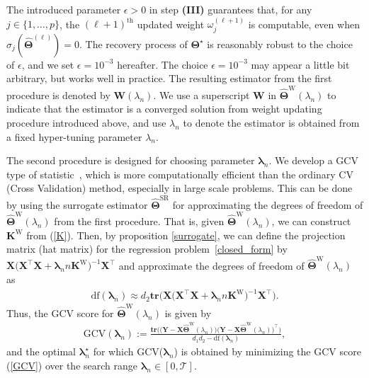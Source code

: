 \documentclass[alpha-refs]{wiley-article}
\begin{document}
The introduced parameter $\epsilon>0$ in step {\bf(III)} guarantees that, for any $j\in\{1,\dots,p\}$,  
the $(\ell+1)^{\text{th}}$ updated weight $\omega_{j}^{(\ell+1)}$ is computable, even when $\sigma_{j}(\widehat{\boldsymbol{\Theta}}^{(\ell)})=0$.
The recovery process of $\boldsymbol{\Theta}^{\star}$ is reasonably robust to the choice of $\epsilon$, and we set $\epsilon=10^{-3}$ hereafter.
The choice $\epsilon=10^{-3}$ may appear a little bit arbitrary, but works well in practice. The resulting estimator from the first procedure is denoted by $\boldsymbol{\text{W}}(\lambda_{n})$. We use a superscript $\boldsymbol{\text{W}}$ in $\widehat{\boldsymbol{\Theta}}^{\text{W}}(\lambda_{n})$ to indicate that the estimator is a converged solution from weight updating procedure introduced above, and use $\lambda_{n}$ to denote the estimator is obtained from a fixed hyper-tuning parameter  $\lambda_{n}$.

The second procedure is designed for choosing parameter $\boldsymbol{\lambda}_{n}$. We develop a GCV type of statistic~\citep{golub1979generalized}, which is more computationally efficient than the ordinary CV (Cross Validation) method, especially in large scale problems. This can be done by using the surrogate estimator $\widehat{\boldsymbol{\Theta}}^{\text{SR}}$ for approximating the degrees of freedom of $\widehat{\boldsymbol{\Theta}}^{\text{W}}(\lambda_{n})$ from the first procedure. That is, given $\widehat{\boldsymbol{\Theta}}^{\text{W}}(\lambda_{n})$, we can construct $\boldsymbol{K}^{\text{W}}$ from (\ref{K}).
Then, by proposition \ref{surrogate}, we can define the projection matrix (hat matrix) for the regression problem~\eqref{closed_form} by $\boldsymbol{X} \big(\boldsymbol{X}^{\top}\boldsymbol{X}+\boldsymbol{\lambda}_{n}n\boldsymbol{K}^{\text{W}}\big)^{-1}\boldsymbol{X}^{\top}$ and approximate the degrees of freedom of $\widehat{\boldsymbol{\Theta}}^{\text{W}}(\lambda_{n})$ as 
\begin{align}
    \text{df}(\boldsymbol{\lambda}_{n}) \approx d_{2} \textbf{tr}\big(\boldsymbol{X} \big(\boldsymbol{X}^{\top}\boldsymbol{X}+\boldsymbol{\lambda}_{n}n\boldsymbol{K}^{\text{W}}\big)^{-1}\boldsymbol{X}^{\top}\big).
\end{align}
Thus, the GCV score for $\widehat{\boldsymbol{\Theta}}^{\text{W}}(\lambda_{n})$ is given by
\begin{align} \label{GCV}
    \text{GCV}(\boldsymbol{\lambda}_{n}) := \frac{\textbf{tr}\big(\big(\boldsymbol{Y}-\boldsymbol{X}\widehat{\boldsymbol{\Theta}}^{\text{W}}(\lambda_{n})\big)\big(\boldsymbol{Y}-\boldsymbol{X}\widehat{\boldsymbol{\Theta}}^{\text{W}}(\lambda_{n})\big)^{\top}\big)}{d_{1}d_{2}-\text{df}(\boldsymbol{\lambda}_{n})},
\end{align}
and the optimal $\boldsymbol{\lambda}_{n}^{\star}$ for which GCV($\boldsymbol{\lambda}_{n}$) is obtained by minimizing the GCV score (\ref{GCV}) over the search range $\boldsymbol{\lambda}_{n}\in [0,\mathcal{T}]$.
\end{document}
